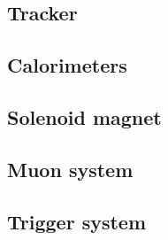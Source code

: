 \subsection{Tracker} \label{sec:InnerTracker}


\subsection{Calorimeters} \label{sec:Calorimeters}


\subsection{Solenoid magnet} \label{sec:SolenoidMagnet}


\subsection{Muon system} \label{sec:MuonSystem}


\subsection{Trigger system} \label{sec:Trigger}
